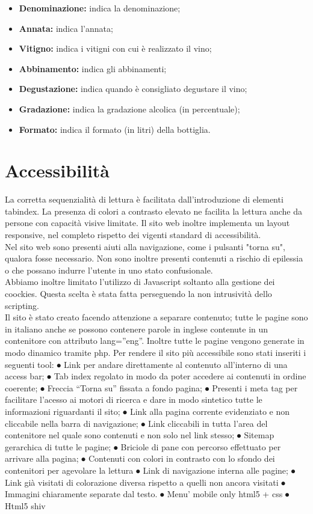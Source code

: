 \begin{itemize}
\begin{itemize}
		\item \textbf{Denominazione:} indica la denominazione;
		\item \textbf{Annata:} indica l'annata;
		\item \textbf{Vitigno:} indica i vitigni con cui è realizzato il vino;
		\item \textbf{Abbinamento:} indica gli abbinamenti;
		\item \textbf{Degustazione:} indica quando è consigliato degustare il vino;
		\item \textbf{Gradazione:} indica la gradazione alcolica (in percentuale);
		\item \textbf{Formato:} indica il formato (in litri) della bottiglia.
	\end{itemize}
\end{itemize}

\section{Accessibilità}

La corretta sequenzialità di lettura è facilitata dall'introduzione di elementi
tabindex. La presenza di colori a contrasto elevato ne facilita la lettura anche da persone con capacità visive limitate. Il sito web inoltre implementa un layout responsive, nel completo rispetto dei vigenti standard di accessibilità.\\
Nel sito web sono presenti aiuti alla navigazione, come i pulsanti "torna su", qualora fosse necessario. Non sono inoltre presenti contenuti a rischio di epilessia o che possano indurre l'utente in uno stato
confusionale.\\
Abbiamo inoltre limitato l'utilizzo di Javascript soltanto alla gestione dei coockies. Questa scelta è stata fatta perseguendo la non intrusività dello scripting.\\

Il sito è stato creato facendo attenzione a separare contenuto; tutte le pagine sono in italiano anche se possono contenere parole in inglese contenute in un contenitore con attributo lang=”eng”. Inoltre tutte le pagine vengono generate in modo dinamico tramite php.
Per rendere il sito più accessibile sono stati inseriti i seguenti tool:
⦁	Link per andare direttamente al contenuto all’interno di una access bar;
⦁	Tab index regolato in modo da poter accedere ai contenuti in ordine coerente;
⦁	Freccia “Torna su” fissata a fondo pagina;
⦁	Presenti i meta tag per facilitare l’acesso ai motori di ricerca e dare in modo sintetico tutte
	le informazioni riguardanti il sito;
⦁	Link alla pagina corrente evidenziato e non cliccabile nella barra di navigazione;
⦁	Link cliccabili in tutta l’area del contenitore nel quale sono contenuti e non solo nel link stesso;
⦁	Sitemap gerarchica di tutte le pagine;
⦁	Briciole di pane con percorso effettuato per arrivare alla pagina;
⦁	Contenuti con colori in contrasto con lo sfondo dei contenitori per agevolare la lettura
⦁	Link di navigazione interna alle pagine;
⦁	Link già visitati di colorazione diversa rispetto a quelli non ancora visitati
⦁	Immagini chiaramente separate dal testo.
⦁	Menu’ mobile only html5 + css
⦁	Html5 shiv

